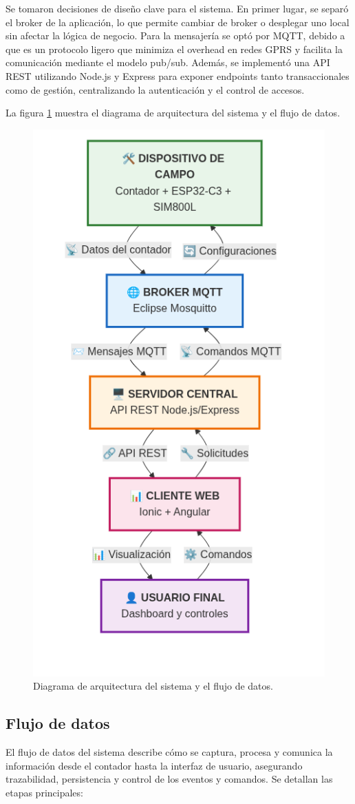 Se tomaron decisiones de diseño clave para el sistema. En primer lugar, se separó el broker de la aplicación, lo que permite cambiar de broker o desplegar uno local sin afectar la lógica de negocio. Para la mensajería se optó por MQTT, debido a que es un protocolo ligero que minimiza el overhead en redes GPRS y facilita la comunicación mediante el modelo pub/sub. Además, se implementó una API REST utilizando Node.js y Express para exponer endpoints tanto transaccionales como de gestión, centralizando la autenticación y el control de accesos.


La figura \ref{fig:diag_arquitectura} muestra el diagrama de arquitectura del sistema y el flujo de datos.


\begin{figure}[H]
  \centering
  \includegraphics[width=0.45\linewidth]{./Figures/diagArq.png}
  \caption{Diagrama de arquitectura del sistema y el flujo de datos.}
  \label{fig:diag_arquitectura}
\end{figure}



\subsection{Flujo de datos} 
El flujo de datos del sistema describe cómo se captura, procesa y comunica la información desde el contador hasta la interfaz de usuario, asegurando trazabilidad, persistencia y control de los eventos y comandos. Se detallan las etapas principales:

